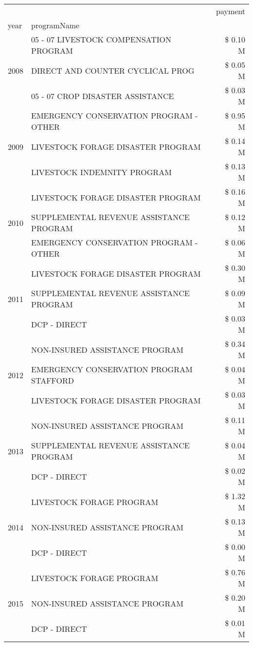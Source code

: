 \begin{tabular}{llr}
\toprule
 &  & payment \\
year & programName &  \\
\midrule
\multirow[t]{3}{*}{2008} & 05 - 07 LIVESTOCK COMPENSATION PROGRAM & \$ 0.10 M \\
 & DIRECT AND COUNTER CYCLICAL PROG & \$ 0.05 M \\
 & 05 - 07 CROP DISASTER ASSISTANCE & \$ 0.03 M \\
\cline{1-3}
\multirow[t]{3}{*}{2009} & EMERGENCY CONSERVATION PROGRAM - OTHER & \$ 0.95 M \\
 & LIVESTOCK FORAGE DISASTER  PROGRAM & \$ 0.14 M \\
 & LIVESTOCK INDEMNITY PROGRAM & \$ 0.13 M \\
\cline{1-3}
\multirow[t]{3}{*}{2010} & LIVESTOCK FORAGE DISASTER  PROGRAM & \$ 0.16 M \\
 & SUPPLEMENTAL REVENUE ASSISTANCE PROGRAM & \$ 0.12 M \\
 & EMERGENCY CONSERVATION PROGRAM - OTHER & \$ 0.06 M \\
\cline{1-3}
\multirow[t]{3}{*}{2011} & LIVESTOCK FORAGE DISASTER PROGRAM & \$ 0.30 M \\
 & SUPPLEMENTAL REVENUE ASSISTANCE PROGRAM & \$ 0.09 M \\
 & DCP - DIRECT & \$ 0.03 M \\
\cline{1-3}
\multirow[t]{3}{*}{2012} & NON-INSURED ASSISTANCE PROGRAM & \$ 0.34 M \\
 & EMERGENCY CONSERVATION PROGRAM STAFFORD & \$ 0.04 M \\
 & LIVESTOCK FORAGE DISASTER PROGRAM & \$ 0.03 M \\
\cline{1-3}
\multirow[t]{3}{*}{2013} & NON-INSURED ASSISTANCE PROGRAM & \$ 0.11 M \\
 & SUPPLEMENTAL REVENUE ASSISTANCE PROGRAM & \$ 0.04 M \\
 & DCP - DIRECT & \$ 0.02 M \\
\cline{1-3}
\multirow[t]{3}{*}{2014} & LIVESTOCK FORAGE PROGRAM & \$ 1.32 M \\
 & NON-INSURED ASSISTANCE PROGRAM & \$ 0.13 M \\
 & DCP - DIRECT & \$ 0.00 M \\
\cline{1-3}
\multirow[t]{3}{*}{2015} & LIVESTOCK FORAGE PROGRAM & \$ 0.76 M \\
 & NON-INSURED ASSISTANCE PROGRAM & \$ 0.20 M \\
 & DCP - DIRECT & \$ 0.01 M \\

\end{tabular}
